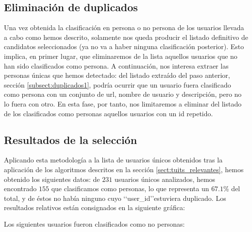 

\subsection{Eliminación de duplicados}
\label{subsect:duplicados2}
Una vez obtenida la clasificación en persona o no persona de los usuarios llevada a cabo como
hemos descrito, solamente nos queda producir el listado definitivo de candidatos seleccionados 
(ya no va a haber ninguna clasificación posterior). Esto implica, en primer lugar, que eliminaremos
de la lista aquellos usuarios que no han sido clasificados como persona. A continuación, nos interesa
extraer las personas únicas que hemos detectado: del listado extraído del paso anterior, 
sección \ref{subsect:duplicados1}, podría ocurrir que un usuario  fuera clasificado como persona con un
conjunto de url, nombre de usuario y descripción, pero no lo fuera con otro. En esta fase, por tanto, nos limitaremos a eliminar del listado de los clasificados como personas aquellos usuarios con un id repetido.

\subsection{Resultados de la selección}
Aplicando esta metodología a la lista de usuarios únicos obtenidos tras la aplicación
de los algoritmos descritos en la sección \ref{sect:tuits_relevantes}, 
hemos obtenido los siguientes datos: de $231$ usuarios únicos analizados, 
hemos encontrado $155$ que clasificamos como 
personas, lo que representa un $67.1$\%  del total, y de éstos
no había ninguno cuyo \lq\lq user\_id\rq\rq estuviera duplicado. Los resultados relativos están consignados en la siguiente gráfica:



Los siguientes usuarios fueron clasificados como no personas:


